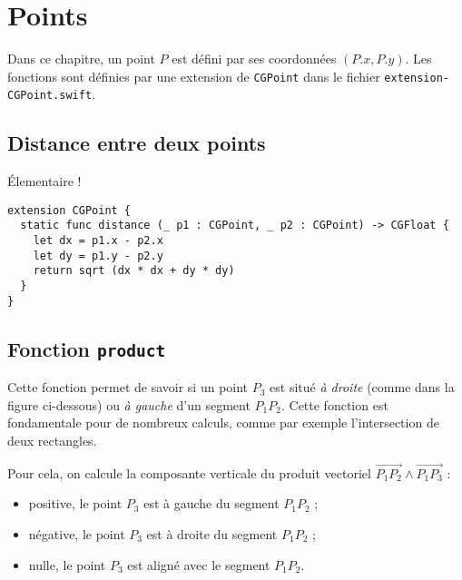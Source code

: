 

\chapter{Points}

Dans ce chapitre, un point $P$ est défini par ses coordonnées $(P.x, P.y)$. Les fonctions sont définies par une extension de \texttt{CGPoint} dans le fichier \texttt{extension-CGPoint.swift}.


\section{Distance entre deux points}

Élementaire !


\begin{lstlisting}
extension CGPoint {
  static func distance (_ p1 : CGPoint, _ p2 : CGPoint) -> CGFloat {
    let dx = p1.x - p2.x
    let dy = p1.y - p2.y
    return sqrt (dx * dx + dy * dy)
  }
}
\end{lstlisting}




\section{Fonction \texttt{product}}

Cette fonction permet de savoir si un point $P_3$ est situé \emph{à droite} (comme dans la figure ci-dessous) ou \emph{à gauche} d'un segment $P_1P_2$. Cette fonction est fondamentale pour de nombreux calculs, comme par exemple l'intersection de deux rectangles.

\begin{center}
\end{center}

Pour cela, on calcule la composante verticale du produit vectoriel $\overrightarrow{P_1P_2} \wedge \overrightarrow{P_1P_3}$ :
\begin{itemize}
\item positive, le point $P_3$ est à gauche du segment $P_1P_2$ ;
\item négative, le point $P_3$ est à droite du segment $P_1P_2$ ;
\item nulle, le point $P_3$ est aligné avec le segment $P_1P_2$.
\end{itemize}


